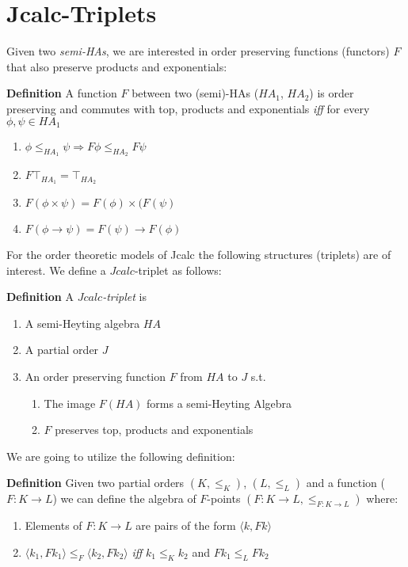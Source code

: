 \section{Jcalc-Triplets}
Given two \emph{semi-HAs}, we are 
interested in order preserving 
functions (functors) $F$ that also preserve products and exponentials: 
\begin{mdframed}
    \textbf{Definition}
A function $F$ between two (semi)-HAs ($HA_1$, $HA_2$) is order preserving
and commutes with top, products and exponentials \emph{iff} for every 
$\phi,\psi \in HA_1$
    \begin{enumerate}
    \item $\phi\le_{HA_1}\psi\Rightarrow F\phi\le_{HA_2}F\psi$
    \item $F\top_{HA_1} = \top_{HA_2}$ 
    \item{$F(\phi \times\psi) = F(\phi)\times(F(\psi)$} 
    \item $F(\phi\rightarrow \psi) = F(\psi)\rightarrow F(\phi)$
    \end{enumerate}
\end{mdframed}

For the order theoretic models of  Jcalc  the following structures (triplets) 
are of interest. We define a $Jcalc$-triplet as follows:
\begin{mdframed}
    \textbf{Definition}
A \emph{$Jcalc$-triplet} is 
    
\begin{enumerate}
\item A semi-Heyting algebra $HA$
\item A partial order $J$
\item An order preserving function $F$ from $HA$ to $J$ s.t.
\begin{enumerate}
    \item The image $F(HA)$ forms a semi-Heyting Algebra
    \item $F$ preserves top, products and exponentials
\end{enumerate}
\end{enumerate}
\end{mdframed}

We are going to utilize the following definition: 

\begin{mdframed}
    \textbf{Definition}
    Given two partial orders $(K,\le_{K})$, $(L,\le_{L})$ and a function ($F: K\rightarrow L$) 
    we can define the algebra of $F$-points  $(F:K \rightarrow L,\le_{F:K\rightarrow L})$
    where:
    \begin{enumerate}
        \item Elements of $F:K\rightarrow L$ are  pairs of the form $\langle k,Fk \rangle$
        \item $\langle k_1,Fk_1 \rangle \le_F \langle k_2, Fk_2\rangle$ \textit{iff}  $k_1\le_{K}k_2$ and $Fk_1\le_{L}Fk_2$ 
    \end{enumerate}
\end{mdframed}

